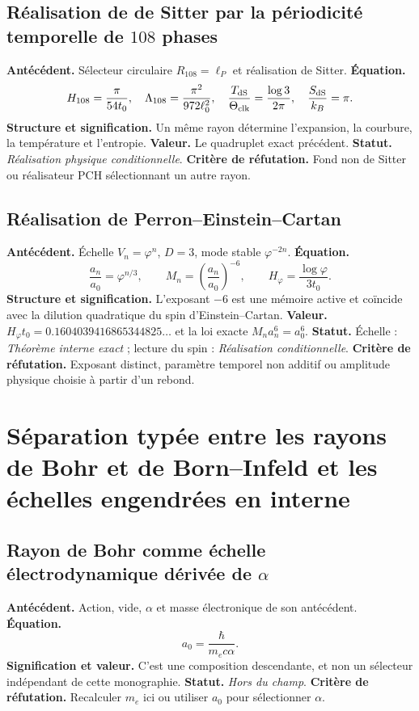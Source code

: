 \subsection*{Réalisation de de Sitter par la périodicité temporelle de \(108\) phases}
\textbf{Antécédent.} Sélecteur circulaire \(R_{108}=\ell_P\) et réalisation de
Sitter. \textbf{Équation.}
\[
H_{108}=\frac{\pi}{54t_0},\quad
\Lambda_{108}=\frac{\pi^2}{972\ell_0^2},\quad
\frac{T_{\rm dS}}{\Theta_{\rm clk}}=\frac{\log3}{2\pi},\quad
\frac{S_{\rm dS}}{k_B}=\pi.
\]
\textbf{Structure et signification.} Un même rayon détermine l'expansion,
la courbure, la température et l'entropie. \textbf{Valeur.} Le quadruplet exact
précédent. \textbf{Statut.} \emph{Réalisation physique conditionnelle}.
\textbf{Critère de réfutation.} Fond non de Sitter ou réalisateur PCH sélectionnant un autre
rayon.

\subsection*{Réalisation de Perron--Einstein--Cartan }
\textbf{Antécédent.} Échelle \(V_n=\varphi^n\), \(D=3\), mode stable
\(\varphi^{-2n}\). \textbf{Équation.}
\[
\frac{a_n}{a_0}=\varphi^{n/3},\qquad
M_n=\left(\frac{a_n}{a_0}\right)^{-6},\qquad
H_\varphi=\frac{\log\varphi}{3t_0}.
\]
\textbf{Structure et signification.} L'exposant \(-6\) est une mémoire active et
coïncide avec la dilution quadratique du spin d'Einstein--Cartan.
\textbf{Valeur.} \(H_\varphi t_0=0.1604039416865344825\ldots\) et la loi exacte
\(M_na_n^6=a_0^6\). \textbf{Statut.} Échelle :
\emph{Théorème interne exact} ; lecture du spin : \emph{Réalisation conditionnelle}.
\textbf{Critère de réfutation.} Exposant distinct, paramètre temporel non
additif ou amplitude physique
choisie à partir d'un rebond.

\section{Séparation typée entre les rayons de Bohr et de Born--Infeld et les échelles engendrées en interne}

\subsection*{Rayon de Bohr comme échelle électrodynamique dérivée de \(\alpha\)}
\textbf{Antécédent.} Action, vide, \(\alpha\) et masse électronique de son
antécédent. \textbf{Équation.}
\begin{equation}
a_0=\frac{\hbar}{m_ec\alpha}.
\label{eq:atlas-bohr}
\end{equation}
\textbf{Signification et valeur.} C'est une composition
descendante, et non un sélecteur indépendant de cette monographie.
\textbf{Statut.} \emph{Hors du champ}. \textbf{Critère de réfutation.} Recalculer
\(m_e\) ici ou utiliser \(a_0\) pour sélectionner \(\alpha\).

